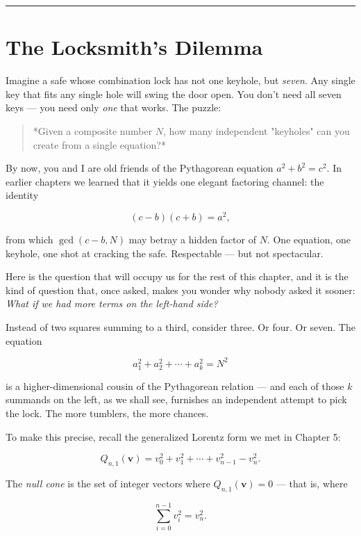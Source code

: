 \documentclass[11pt,openany]{book}
\theoremstyle{definition}
\theoremstyle{plain}
\theoremstyle{remark}
\begin{document}
\bigskip\noindent\rule{\textwidth}{0.4pt}\bigskip


\section*{The Locksmith's Dilemma}


Imagine a safe whose combination lock has not one keyhole, but \textit{seven}. Any single key that fits any single hole will swing the door open. You don't need all seven keys — you need only \textit{one} that works. The puzzle:

\begin{quote}
*Given a composite number $N$, how many independent "keyholes" can you create from a single equation?*
\end{quote}


By now, you and I are old friends of the Pythagorean equation $a^2 + b^2 = c^2$. In earlier chapters we learned that it yields one elegant factoring channel: the identity

$$(c - b)(c + b) = a^2,$$

from which $\gcd(c - b, N)$ may betray a hidden factor of $N$. One equation, one keyhole, one shot at cracking the safe. Respectable — but not spectacular.

Here is the question that will occupy us for the rest of this chapter, and it is the kind of question that, once asked, makes you wonder why nobody asked it sooner: \textit{What if we had more terms on the left-hand side?}

Instead of two squares summing to a third, consider three. Or four. Or seven. The equation

$$a_1^2 + a_2^2 + \cdots + a_k^2 = N^2$$

is a higher-dimensional cousin of the Pythagorean relation — and each of those $k$ summands on the left, as we shall see, furnishes an independent attempt to pick the lock. The more tumblers, the more chances.

To make this precise, recall the generalized Lorentz form we met in Chapter 5:

$$Q_{n,1}(\mathbf{v}) = v_0^2 + v_1^2 + \cdots + v_{n-1}^2 - v_n^2.$$

The \textit{null cone} is the set of integer vectors where $Q_{n,1}(\mathbf{v}) = 0$ — that is, where

$$\sum_{i=0}^{n-1} v_i^2 = v_n^2.$$
\end{document}
